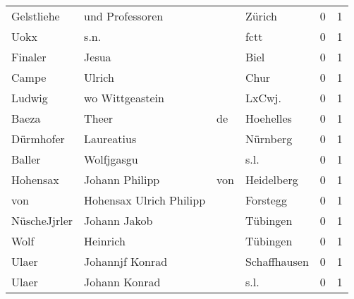 \begin{center}
\begin{tiny}
\begin{longtabu}{llllrr}
               Gelstliehe &                    und Professoren &             &                                      Zürich &          0 &         1 \\
                     Uokx &                               s.n. &             &                                        fctt &          0 &         1 \\
                  Finaler &                              Jesua &             &                                        Biel &          0 &         1 \\
                    Campe &                             Ulrich &             &                                        Chur &          0 &         1 \\
                   Ludwig &                    wo Wittgeastein &             &                                     LxCwj.  &          0 &         1 \\
                    Baeza &                              Theer &          de &                                   Hoehelles &          0 &         1 \\
                Dürmhofer &                         Laureatius &             &                                    Nürnberg &          0 &         1 \\
                   Baller &                         Wolfjgasgu &             &                                        s.l. &          0 &         1 \\
                 Hohensax &                     Johann Philipp &         von &                                  Heidelberg &          0 &         1 \\
                      von &            Hohensax Ulrich Philipp &             &                                    Forstegg &          0 &         1 \\
             NüscheJjrler &                       Johann Jakob &             &                                    Tübingen &          0 &         1 \\
                     Wolf &                           Heinrich &             &                                    Tübingen &          0 &         1 \\
                    Ulaer &                    Johannjf Konrad &             &                                Schaffhausen &          0 &         1 \\
                    Ulaer &                      Johann Konrad &             &                                        s.l. &          0 &         1 \\

\end{longtabu}
\end{tiny}
\end{center}
